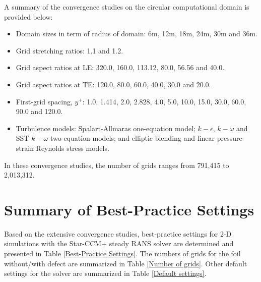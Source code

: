 \documentclass[onecolumn,11pt]{report}
\begin{document}
A summary of the convergence studies on the circular computational domain is provided below:

\begin{itemize}
\item Domain sizes in term of radius of domain: 6m, 12m, 18m, 24m, 30m and 36m. 

\item Grid stretching ratios: 1.1 and 1.2.

\item Grid aspect ratios at LE: 320.0, 160.0, 113.12, 80.0, 56.56 and 40.0.

\item Grid aspect ratios at TE: 120.0, 80.0, 60.0, 40.0, 30.0 and 20.0.

\item First-grid spacing, $y^+$: 1.0, 1.414, 2.0, 2.828, 4.0, 5.0, 10.0, 15.0, 30.0, 60.0, 90.0 and 120.0.

\item Turbulence models: Spalart-Allmaras one-equation model; $k-\epsilon$, $k-\omega$ and SST $k-\omega$ two-equation models; and elliptic blending and linear pressure-strain Reynolds stress models.

\end{itemize}

In these convergence studies, the number of grids ranges from 791,415 to 2,013,312.

\section{Summary of Best-Practice Settings}

Based on the extensive convergence studies, best-practice settings for 2-D simulations with the Star-CCM+ steady RANS solver are determined and presented in Table \ref{Best-Practice Settings}. The numbers of grids for the foil without/with defect are summarized in Table \ref{Number of grids}. Other default settings for the solver are summarized in Table  \ref{Default settings}. 
\end{document}
